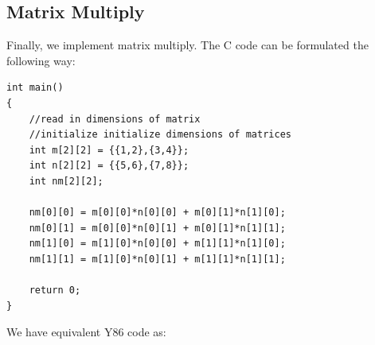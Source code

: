 \documentclass{article}
\begin{document}
\subsection{Matrix Multiply}
Finally, we implement matrix multiply. The C code can be formulated the following way:
\begin{verbatim}
int main()
{
    //read in dimensions of matrix
    //initialize initialize dimensions of matrices
    int m[2][2] = {{1,2},{3,4}};
    int n[2][2] = {{5,6},{7,8}};
    int nm[2][2];

    nm[0][0] = m[0][0]*n[0][0] + m[0][1]*n[1][0];
    nm[0][1] = m[0][0]*n[0][1] + m[0][1]*n[1][1];
    nm[1][0] = m[1][0]*n[0][0] + m[1][1]*n[1][0];
    nm[1][1] = m[1][0]*n[0][1] + m[1][1]*n[1][1];
    
    return 0;
}
\end{verbatim}
We have equivalent Y86 code as: 
\end{document}
